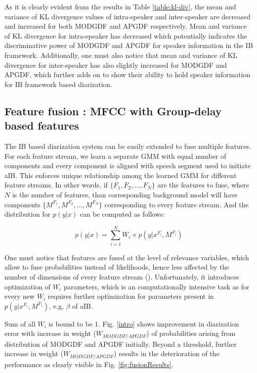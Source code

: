\documentclass[conference]{IEEEtran}
\begin{document}
As it is clearly evident from the results in Table \ref{table:kl-div}, the mean and variance of KL divergence values of intra-speaker and inter-speaker are decreased and increased for both MODGDF and APGDF respectively. Mean and variance of KL divergence for intra-speaker has decreased which potentially indicates the discriminative power of MODGDF and APGDF for speaker information in the IB framework. Additionally, one must also notice that mean and variance of KL divergence for inter-speaker has also slightly increased for MODGDF and APGDF, which further adds on to show their ability to hold speaker information for IB framework based diarization.  

\subsection{Feature fusion : MFCC with Group-delay based features}

The IB based diarization system can be easily extended to fuse multiple features. For each feature stream, we learn a separate GMM with equal number of components and every component is aligned with speech segment used to initiate aIB. This enforces unique relationship among the learned GMM for different feature streams. In other words, if $\lbrace F_1,F_2,...,F_N \rbrace$ are the features to fuse, where $N$ is the number of features, than corresponding background model will have components $\lbrace M^{F_{1}},M^{F_{2}},...,M^{F_{N}}\rbrace$ corresponding to every feature stream. And the distribution for $p(y|x)$ can be computed as follows:       

\begin{equation}
p(y|x) = \sum _{i=1}^{N} W_i \times p(y|x^{F_{i}},M^{F_{i}})
\label{eq:feat_combs}
\end{equation}

One must notice that features are fused at the level of relevance variables, which allow to fuse probabilities instead of likelihoods, hence less affected by the number of dimensions of every feature stream (\cite{aIB}). Unfortunately, it introduces optimization of $W_i$ parameters, which is an computationally intensive task as for every new $W_i$ requires further optimization for parameters present in $p(y|x^{F_{i}},M^{F_{i}})$, e.g, $\beta$ of aIB.

Sum of all $W_i$ is bound to be $1$. Fig. \ref{intro} shows improvement in diarization error with increase in weight ($W_{MODGDF/APGDF}$) of probabilities arising from distribution of MODGDF and APGDF initially. Beyond a threshold, further increase in weight ($W_{MODGDF/APGDF}$) results in the deterioration of the performance as clearly visible in Fig. \ref{fig:fusionResults}.   
\end{document}
